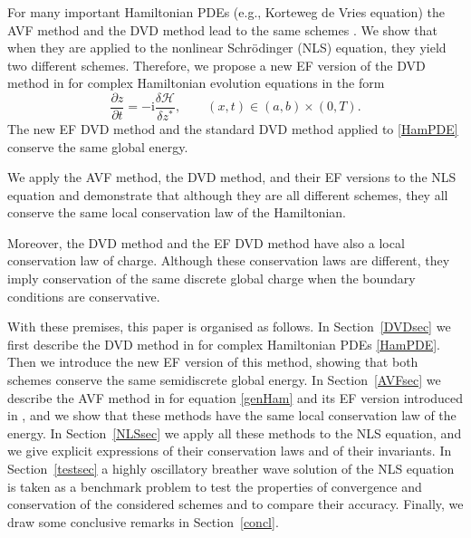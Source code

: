 \documentclass[twoside]{article}
\numberwithin{equation}{section}
\begin{document}
For many important Hamiltonian PDEs (e.g., Korteweg de Vries equation) the AVF method and the DVD method lead to the same schemes \cite{Dahlby}. We show that when they are applied to the nonlinear Schr\"odinger (NLS) equation, they yield two different schemes. Therefore, we propose a new EF version of the DVD method in \cite{Matsuo} for complex Hamiltonian evolution equations in the form
\begin{equation}\label{HamPDE}
\frac{\partial z}{\partial t}=-\mathrm{i}\frac{\delta \mathcal H}{\delta z^*},\qquad (x,t)\in(a,b)\times(0,T).
\end{equation}
The new EF DVD method and the standard DVD method applied to \eqref{HamPDE} conserve the same global energy.

We apply the AVF method, the DVD method, and their EF versions to the NLS equation and demonstrate that although they are all different schemes, they all conserve the same local conservation law of the Hamiltonian. 

Moreover, the DVD method and the EF DVD method have also a local conservation law of charge. Although these conservation laws are different, they imply conservation of the same discrete global charge  when the boundary conditions are conservative.

With these premises, this paper is organised as follows. In Section~\ref{DVDsec} we first describe the DVD method in \cite{Matsuo} for complex Hamiltonian PDEs \eqref{HamPDE}. Then we introduce the new EF version of this method, showing that both schemes conserve the same semidiscrete global energy. In Section~\ref{AVFsec} we describe the AVF method in \cite{Quisp} for equation \eqref{genHam} and its EF version introduced in \cite{Miya}, and we show that these methods have the same local conservation law of the energy. In Section~\ref{NLSsec} we apply all these methods to the NLS equation, and we give explicit expressions of their conservation laws and of their invariants. In Section~\ref{testsec} a highly oscillatory breather wave solution of the NLS equation is taken as a benchmark problem to test the properties of convergence and conservation of the considered schemes and to compare their accuracy. Finally, we draw some conclusive remarks in Section~\ref{concl}.
\end{document}
